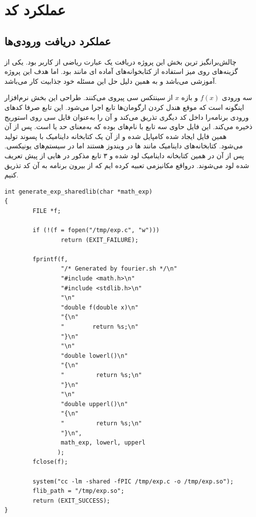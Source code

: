 \documentclass[a4paper]{report}
\begin{document}
\newpage
\section{عملکرد کد}
\subsection{عملکرد دریافت ورودی‌ها}
چالش‌برانگیز ترین بخش این پروژه دریافت یک عبارت ریاضی از کاربر بود. یکی از گزینه‌های روی میز استفاده از کتابخوانه‌های آماده ای
مانند  بود. اما هدف این پروژه آموزشی می‌باشد و به همین دلیل حل این مسئله خود جذابیت کار می‌باشد.

سه ورودی $f(x)$ و بازه $x$ از سینتکس سی پیروی می‌کنند. طراحی این بخش نرم‌افزار اینگونه است که موقع هندل کردن ارگومان‌ها
تابع  اجرا می‌شود. این تابع صرفا کدهای ورودی برنامه‌را داخل کد دیگری تذریق می‌کند و آن را به‌عنوان
فایل سی روی استوریج ذخیره می‌کند. این فایل حاوی سه تابع با نام‌های  بوده که  به‌معنای حد یا  است.
پس از آن همین فایل ایجاد شده کامپایل شده و از آن یک کتابخانه داینامیک
با پسوند  تولید می‌شود. کتابخانه‌های داینامیک مانند  ها در ویندوز هستند اما در سیستم‌های یونیکسی.
پس از آن در  همین کتابخانه داینامیک لود شده و ۳ تابع مذکور در  هایی از پیش تعریف شده لود می‌شوند.
درواقع مکانیزمی تعبیه کرده ایم که از بیرون برنامه به آن کد تذریق کنیم.

\begin{latin}
\begin{verbatim}
int generate_exp_sharedlib(char *math_exp)
{
        FILE *f;

        if (!(f = fopen("/tmp/exp.c", "w")))
                return (EXIT_FAILURE);

        fprintf(f,
                "/* Generated by fourier.sh */\n"
                "#include <math.h>\n"
                "#include <stdlib.h>\n"
                "\n"
                "double f(double x)\n"
                "{\n"
                "        return %s;\n"
                "}\n"
                "\n"
                "double lowerl()\n"
                "{\n"
                "         return %s;\n"
                "}\n"
                "\n"
                "double upperl()\n"
                "{\n"
                "         return %s;\n"
                "}\n",
                math_exp, lowerl, upperl
               );
        fclose(f);

        system("cc -lm -shared -fPIC /tmp/exp.c -o /tmp/exp.so");
        flib_path = "/tmp/exp.so";
        return (EXIT_SUCCESS);
}
\end{verbatim}
\end{latin}
\end{document}
